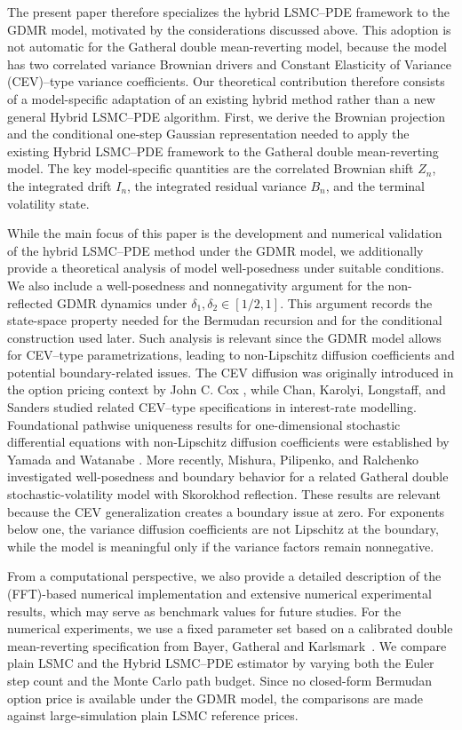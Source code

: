 \documentclass[pdflatex,sn-mathphys-num]{sn-jnl}
\theoremstyle{thmstyleone}%
\theoremstyle{thmstylethree}%
\theoremstyle{thmstyletwo}%
\begin{document}
The present paper therefore specializes the hybrid LSMC–PDE framework to the GDMR model, motivated by the considerations discussed above.  This adoption is not automatic for the Gatheral double mean-reverting model, because the model has two correlated variance Brownian drivers and Constant Elasticity of Variance (CEV)--type variance coefficients. Our theoretical contribution therefore consists of a model-specific adaptation of an existing hybrid method rather than a new general Hybrid LSMC--PDE algorithm. First, we derive the Brownian projection and the conditional one-step Gaussian representation needed to apply the existing Hybrid LSMC--PDE framework to the Gatheral double mean-reverting model. The key model-specific quantities are the correlated Brownian shift $Z_n$, the integrated drift $I_n$, the integrated residual variance $B_n$, and the terminal volatility
state.  

While the main focus of this paper is the development and numerical validation of the hybrid LSMC–PDE method under the GDMR model, we additionally provide a theoretical analysis of model well-posedness under suitable conditions. 
We also include a well-posedness and nonnegativity argument for the non-reflected GDMR dynamics under $\delta_1,\delta_2\in[1/2,1]$. This argument records the state-space property needed for the Bermudan recursion and
for the conditional construction used later. Such analysis is relevant since the GDMR model allows for CEV--type parametrizations, leading to non-Lipschitz diffusion coefficients and potential boundary-related issues. The CEV diffusion was originally introduced in the option pricing context by John C. Cox \cite{cox1975cev}, while Chan, Karolyi, Longstaff, and Sanders \cite{chan1992empirical} studied related CEV--type specifications in interest-rate modelling. Foundational pathwise uniqueness results for one-dimensional stochastic differential equations with non-Lipschitz diffusion coefficients were established by Yamada and Watanabe \cite{yamada1971uniqueness}. More recently, Mishura, Pilipenko, and Ralchenko \cite{mishura2025gatheral} investigated well-posedness and boundary behavior for a related Gatheral double stochastic-volatility model with Skorokhod reflection. These results are relevant because the CEV generalization creates a boundary issue at zero. For exponents below one, the variance diffusion coefficients are not Lipschitz at the boundary, while the model is meaningful only if the variance factors remain nonnegative.


From a computational perspective, we also provide a detailed description of the (FFT)-based  numerical implementation and extensive numerical experimental results, which may serve as benchmark values for future studies. For the numerical experiments, we use a fixed parameter set based on a calibrated double mean-reverting specification from
Bayer, Gatheral and Karlsmark~\citep{bayer2013fast}. We compare plain LSMC and the Hybrid LSMC--PDE estimator by varying both the Euler step count and the Monte Carlo path budget. Since no closed-form Bermudan option price is available under the GDMR model, the comparisons are made against large-simulation plain LSMC reference prices.
\end{document}
